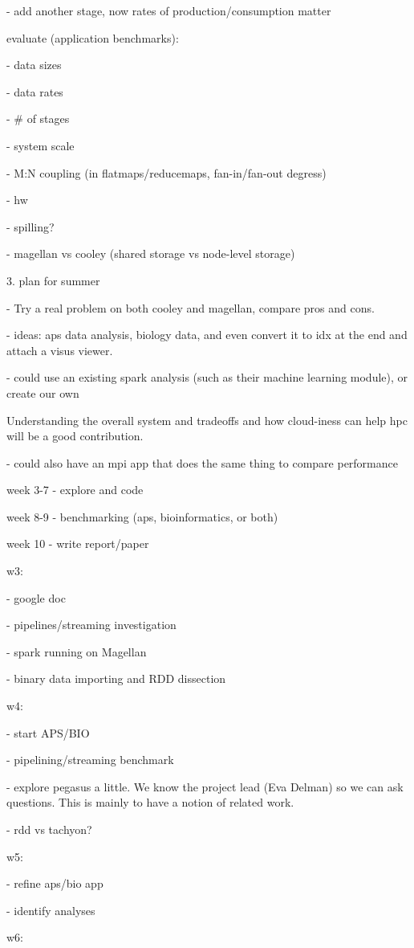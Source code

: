 - add another stage, now rates of production/consumption matter

evaluate (application benchmarks):

- data sizes

- data rates

- \# of stages

- system scale

- M:N coupling (in flatmaps/reducemaps, fan-in/fan-out degress)

- hw

- spilling?

- magellan vs cooley (shared storage vs node-level storage)

3. plan for summer

- Try a real problem on both cooley and magellan, compare pros and cons.

- ideas: aps data analysis, biology data, and even convert it to idx at
the end and attach a visus viewer.

- could use an existing spark analysis (such as their machine learning
module), or create our own

Understanding the overall system and tradeoffs and how cloud-iness can
help hpc will be a good contribution.

- could also have an mpi app that does the same thing to compare
performance

week 3-7 - explore and code

week 8-9 - benchmarking (aps, bioinformatics, or both)

week 10 - write report/paper

w3:

- google doc

- pipelines/streaming investigation

- spark running on Magellan

- binary data importing and RDD dissection

w4:

- start APS/BIO

- pipelining/streaming benchmark

- explore pegasus a little. We know the project lead (Eva Delman) so we
can ask questions. This is mainly to have a notion of related work.

- rdd vs tachyon?

w5:

- refine aps/bio app

- identify analyses

w6:

